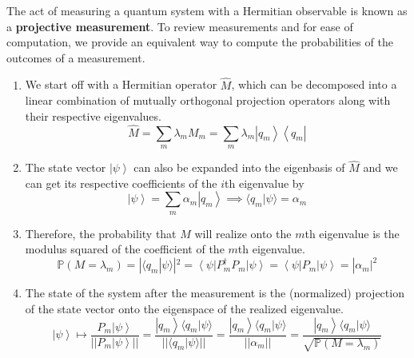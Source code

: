 \documentclass{article}
\newcommand{\ket}[1]{\ensuremath{\left|#1\right\rangle}}
\newcommand{\bra}[1]{\ensuremath{\left\langle#1\right|}}
\newcommand{\braket}[2]{\langle #1 | #2 \rangle}
\begin{document}
  The act of measuring a quantum system with a Hermitian observable is known as a \textbf{projective measurement}. To review measurements and for ease of computation, we provide an equivalent way to compute the probabilities of the outcomes of a measurement. 

  \begin{enumerate} 
    \item We start off with a Hermitian operator $\hat{M}$, which can be decomposed into a linear combination of mutually orthogonal projection operators along with their respective eigenvalues. 
      \begin{equation} 
        \hat{M} = \sum_m \lambda_m M_m = \sum_{m} \lambda_m \ket{q_m} \bra{q_m}
      \end{equation}

    \item The state vector $\ket{\psi}$ can also be expanded into the eigenbasis of $\hat{M}$ and we can get its respective coefficients of the $i$th eigenvalue by 
      \begin{equation} 
        \ket{\psi} = \sum_{m} \alpha_m \ket{q_m} \implies \braket{q_m}{\psi} = \alpha_m
      \end{equation}

    \item Therefore, the probability that $M$ will realize onto the $m$th eigenvalue is the modulus squared of the coefficient of the $m$th eigenvalue. 
      \begin{equation} 
        \mathbb{P}(M = \lambda_m) = |\braket{q_m}{\psi}|^2 = \bra{\psi} P_m^\dagger P_m \ket{\psi} = \bra{\psi} P_m \ket{\psi} = |\alpha_m|^2
      \end{equation}

    \item The state of the system after the measurement is the (normalized) projection of the state vector onto the eigenspace of the realized eigenvalue. 
      \begin{equation} 
        \ket{\psi} \mapsto \frac{P_m \ket{\psi}}{||P_m \ket{\psi}||} = \frac{\ket{q_m} \braket{q_m}{\psi}}{||\braket{q_m}{\psi}||} = \frac{\ket{q_m} \braket{q_m}{\psi}}{||\alpha_m||} = \frac{\ket{q_m} \braket{q_m}{\psi}}{\sqrt{\mathbb{P}(M = \lambda_m)}}
      \end{equation}
  \end{enumerate}
\end{document}
